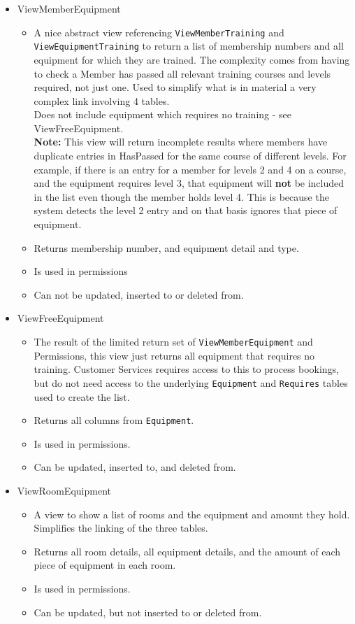 \documentclass[a4paper, titlepage]{article}
\begin{document}
\begin{itemize}
\begin{itemize}
	\end{itemize}
	\item ViewMemberEquipment
	\begin{itemize}
		\item A nice abstract view referencing \texttt{ViewMemberTraining} and \texttt{ViewEquipmentTraining} to return a list of membership numbers and all equipment for which they are trained. The complexity comes from having to check a Member has passed all relevant training courses and levels required, not just one. Used to simplify what is in material a very complex link involving 4 tables. \\
		Does not include equipment which requires no training - see ViewFreeEquipment. \\
		\textbf{Note:} This view will return incomplete results where members have duplicate entries in HasPassed for the same course of different levels. For example, if there is an entry for a member for levels 2 and 4 on a course, and the equipment requires level 3, that equipment will \textbf{not} be included in the list even though the member holds level 4. This is because the system detects the level 2 entry and on that basis ignores that piece of equipment.
		\item Returns membership number, and equipment detail and type.
		\item Is used in permissions
		\item Can not be updated, inserted to or deleted from.
	\end{itemize}
	\item ViewFreeEquipment
	\begin{itemize}
		\item The result of the limited return set of \texttt{ViewMemberEquipment} and Permissions, this view just returns all equipment that requires no training. Customer Services requires access to this to process bookings, but do not need access to the underlying \texttt{Equipment} and \texttt{Requires} tables used to create the list. 
		\item Returns all columns from \texttt{Equipment}.
		\item Is used in permissions.
		\item Can be updated, inserted to, and deleted from.
	\end{itemize}
	\item ViewRoomEquipment
	\begin{itemize}
		\item A view to show a list of rooms and the equipment and amount they hold. Simplifies the linking of the three tables.
		\item Returns all room details, all equipment details, and the amount of each piece of equipment in each room.
		\item Is used in permissions.
		\item Can be updated, but not inserted to or deleted from.
	\end{itemize}
\end{itemize}
\end{document}
